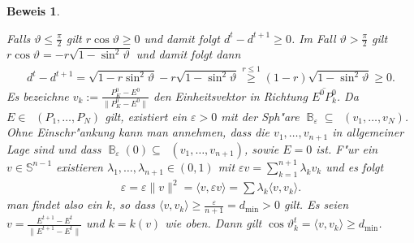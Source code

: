 \documentclass[paper=A4, twoside, chapterprefix=true, bibliography=totoc, headsepline]{scrbook}
\let\temp\phi
\let\phi\varphi
\let\varphi\temp
\let\temp\theta
\let\theta\vartheta
\let\vartheta\temp
\let\temp\epsilon
\let\epsilon\varepsilon
\let\varepsilon\temp
\let\temp\rho
\let\rho\varrho
\let\varrho\temp
\newcommand{\tikzgitter}[3][0.25]{ %
	\draw[step=#1,gray!15] #2 grid #3;
	\draw[step=2*#1,gray!30] #2 grid #3;
	\fill (0,0) circle(0.1); 
}
\DeclareMathOperator{\B}{\mathbb{B}} %
\renewcommand{\S}{\mathbb{S}}
\DeclareMathOperator{\conv}{conv} %
\DeclareMathOperator{\convo}{\stackrel{\circ}{\conv}} %
\newcommand{\normVek}[1]{\frac{#1}{\|#1\|}} %
\theoremstyle{break}
\theoremstyle{nonumberbreak}
\newtheorem{bew}{Beweis}
\theoremstyle{emptybreak}
\theoremstyle{break}
\begin{document}
\begin{bew}
\begin{center}
\end{center}
Falls $\theta \le \frac{\pi}{2}$ gilt $r \cos \theta \ge 0$ und damit folgt $d^t - d^{t+1} \ge 0$. Im Fall $\theta > \frac{\pi}{2}$ gilt $r \cos \theta = -r \sqrt{1 - \sin^2 \theta}$ und damit folgt dann
\begin{align*}
	d^t - d^{t+1} = \sqrt{1 - r \sin^2 \theta} - r \sqrt{1 - \sin^2 \theta} \overset{r \le 1}{\ge} (1 - r) \sqrt{1 - \sin^2 \theta} \ge 0.
\end{align*}
Es bezeichne $v_k := \normVek{P_K^0 - E^0}$ den Einheitsvektor in Richtung $\overline{E^0P_k^0}$.
Da $E \in \convo(P_1, \ldots, P_N)$ gilt, existiert ein $\epsilon > 0$ mit der Sph"are $\B_\epsilon \subseteq \convo(v_1, \ldots, v_N)$.
Ohne Einschr"ankung kann man annehmen, dass die $v_1, \ldots, v_{n+1}$ in allgemeiner Lage sind und dass $\B_\epsilon(0) \subseteq \convo(v_1, \ldots, v_{n+1})$, sowie $E = 0$ ist.
F"ur ein $v \in \S^{n-1}$ existieren $\lambda_1, \ldots, \lambda_{n+1} \in (0,1)$ mit $\epsilon v = \sum_{k=1}^{n+1} \lambda_k v_k$ und es folgt
\begin{align*}
	\epsilon = \epsilon \|v\|^2 = \langle v, \epsilon v \rangle = \sum \lambda_k \langle v, v_k \rangle.
\end{align*}
man findet also ein $k$, so dass $\langle v, v_k \rangle \ge \frac{\epsilon}{n+1} = d_{\min} > 0$ gilt.
Es seien $v = \normVek{E^{t+1} - E^t}$ und $k = k(v)$ wie oben. Dann gilt $\cos \theta_k^t = \langle v, v_k \rangle \ge d_{\min}$.
\begin{center}\begin{tikzpicture}[font=\scriptsize,scale=1]
	

\end{tikzpicture}
\end{center}
\end{bew}
\end{document}
